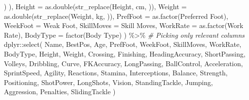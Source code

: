\documentclass[
]{article}
\newenvironment{Shaded}{\begin{snugshade}}{\end{snugshade}}
\newcommand{\AttributeTok}[1]{\textcolor[rgb]{0.77,0.63,0.00}{#1}}
\newcommand{\CommentTok}[1]{\textcolor[rgb]{0.56,0.35,0.01}{\textit{#1}}}
\newcommand{\FunctionTok}[1]{\textcolor[rgb]{0.00,0.00,0.00}{#1}}
\newcommand{\NormalTok}[1]{#1}
\newcommand{\SpecialCharTok}[1]{\textcolor[rgb]{0.00,0.00,0.00}{#1}}
\newcommand{\StringTok}[1]{\textcolor[rgb]{0.31,0.60,0.02}{#1}}
\begin{document}
\begin{Shaded}
\begin{Highlighting}[]
\NormalTok{            )}
\NormalTok{        ),}
        \AttributeTok{Height =} \FunctionTok{as.double}\NormalTok{(}\FunctionTok{str\_replace}\NormalTok{(Height, }\StringTok{\textquotesingle{}cm\textquotesingle{}}\NormalTok{, }\StringTok{\textquotesingle{}\textquotesingle{}}\NormalTok{)),}
        \AttributeTok{Weight =} \FunctionTok{as.double}\NormalTok{(}\FunctionTok{str\_replace}\NormalTok{(Weight, }\StringTok{\textquotesingle{}kg\textquotesingle{}}\NormalTok{, }\StringTok{\textquotesingle{}\textquotesingle{}}\NormalTok{)),}
        \AttributeTok{PrefFoot =} \FunctionTok{as.factor}\NormalTok{(}\StringTok{\textasciigrave{}}\AttributeTok{Preferred Foot}\StringTok{\textasciigrave{}}\NormalTok{),}
        \AttributeTok{WeekFoot =} \StringTok{\textasciigrave{}}\AttributeTok{Weak Foot}\StringTok{\textasciigrave{}}\NormalTok{,}
        \AttributeTok{SkillMoves =} \StringTok{\textasciigrave{}}\AttributeTok{Skill Moves}\StringTok{\textasciigrave{}}\NormalTok{,}
        \AttributeTok{WorkRate =} \FunctionTok{as.factor}\NormalTok{(}\StringTok{\textasciigrave{}}\AttributeTok{Work Rate}\StringTok{\textasciigrave{}}\NormalTok{),}
        \AttributeTok{BodyType =} \FunctionTok{factor}\NormalTok{(}\StringTok{\textasciigrave{}}\AttributeTok{Body Type}\StringTok{\textasciigrave{}}\NormalTok{)}
\NormalTok{    ) }\SpecialCharTok{\%\textgreater{}\%}
    \CommentTok{\# Picking only relevant columns}
\NormalTok{    dplyr}\SpecialCharTok{::}\FunctionTok{select}\NormalTok{(}
\NormalTok{        Name,}
\NormalTok{        BestPos,}
\NormalTok{        Age,}
\NormalTok{        PrefFoot,}
\NormalTok{        WeekFoot,}
\NormalTok{        SkillMoves,}
\NormalTok{        WorkRate,}
\NormalTok{        BodyType,}
\NormalTok{        Height,}
\NormalTok{        Weight,}
\NormalTok{        Crossing,}
\NormalTok{        Finishing,}
\NormalTok{        HeadingAccuracy,}
\NormalTok{        ShortPassing,}
\NormalTok{        Volleys,}
\NormalTok{        Dribbling,}
\NormalTok{        Curve,}
\NormalTok{        FKAccuracy,}
\NormalTok{        LongPassing,}
\NormalTok{        BallControl,}
\NormalTok{        Acceleration,}
\NormalTok{        SprintSpeed,}
\NormalTok{        Agility,}
\NormalTok{        Reactions,}
\NormalTok{        Stamina,}
\NormalTok{        Interceptions,}
\NormalTok{        Balance,}
\NormalTok{        Strength,}
\NormalTok{        Positioning,}
\NormalTok{        ShotPower,}
\NormalTok{        LongShots,}
\NormalTok{        Vision,}
\NormalTok{        StandingTackle,}
\NormalTok{        Jumping,}
\NormalTok{        Aggression,}
\NormalTok{        Penalties,}
\NormalTok{        SlidingTackle}
\NormalTok{    ) }
\end{Highlighting}
\end{Shaded}
\end{document}
